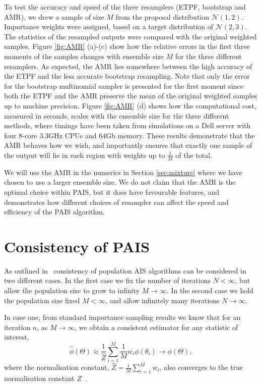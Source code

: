 \documentclass[final]{siamltex}
\begin{document}
To test the accuracy and speed of the three resamplers (ETPF,
bootstrap and AMR), we drew a sample of size $M$ from the proposal distribution
$\mathcal{N}(1,2)$. Importance weights were assigned, based on a
target distribution of $\mathcal{N}(2,3)$. The statistics of the
resampled outputs were compared with the original weighted samples. Figure \ref{fig:AMR} (a)-(c) show how the relative errors in the first
three moments of the samples changes with ensemble size $M$ for the three different
resamplers. As expected, the AMR lies somewhere between the high
accuracy of the ETPF and the less accurate bootstrap
resampling. Note that only the error for the bootstrap multinomial
sampler is presented for the first moment since both the ETPF and the
AMR preserve the mean of the original weighted samples up to machine precision. Figure \ref{fig:AMR} (d) shows how the computational cost,
measured in seconds, scales with the ensemble size for the three
different methods, where timings have been taken from simulations on a Dell
server with four 8-core 3.3GHz CPUs and 64Gb memory. These results demonstrate that the AMR behaves how we wish, and
importantly ensures that exactly one sample of the output will lie in
each region with weights up to $\frac{1}{M}$ of the total.

We will use the AMR in the numerics in Section \ref{sec:mixture}
where we have chosen to use a larger ensemble size. We do not claim
that the AMR is the optimal choice within PAIS, but it does have
favourable features, and demonstrates how different choices of
resampler can affect the speed and efficiency of the PAIS algorithm.


\section{Consistency of PAIS}\label{sec:consistency}

As outlined in~\cite{martino2015adaptive} consistency of population AIS algorithms can be considered in two different cases. In the first case we fix the number of iterations $N < \infty$, but allow the population size to grow to infinity $M\rightarrow\infty$. In the second case we hold the population size fixed $M<\infty$, and allow infinitely many iterations $N\rightarrow\infty$.

In case one, from standard importance sampling results we know that for an iteration $n$, as $M\rightarrow\infty$, we obtain a consistent estimator for any statistic of interest,
\[
	\hat{\phi}(\Theta) \approx \frac{1}{\hat{Z}}\sum\limits_{i=1}^M \! \frac{1}{M}w_i\phi(\theta_i) \rightarrow \phi(\Theta),
\]
where the normalisation constant, $\hat{Z} = \frac{1}{M}\sum_{i=1}^M \! w_i$, also converges to the true normalisation constant $Z$~\cite{robert2013monte}.
\end{document}

